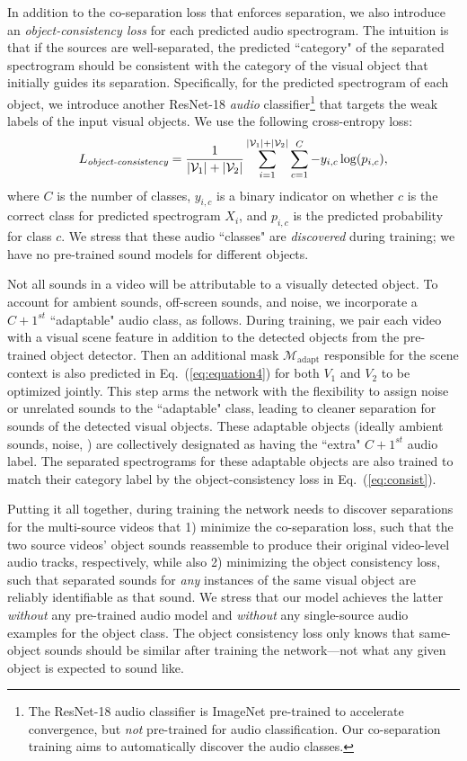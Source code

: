 \documentclass[10pt,twocolumn,letterpaper]{article}
\begin{document}
In addition to the co-separation loss that enforces separation, we also introduce an \emph{object-consistency loss} for each predicted audio spectrogram.  The intuition is that if the sources are well-separated, the predicted ``category" of the separated spectrogram should be consistent with the category of the visual object that initially guides its separation. Specifically, for the predicted spectrogram of each object, we introduce another ResNet-18 \emph{audio} classifier\footnote{The ResNet-18 audio classifier is ImageNet pre-trained to accelerate convergence, but \emph{not} pre-trained for audio classification. Our co-separation training aims to automatically discover the audio classes.} that targets the weak labels of the input visual objects. We use the following cross-entropy loss:
\begin{equation}
	\vspace{-0.05in}
	L_{\emph{object-consistency}} = \frac{1}{|\mathcal{V}_1| + |\mathcal{V}_2|} \sum_{i=1}^{|\mathcal{V}_1| + |\mathcal{V}_2|} \sum_{c=1}^{C} -y_{i,c}\log(p_{i,c}),\label{eq:consist}
\end{equation}
where $C$ is the number of classes, $y_{i,c}$ is a binary indicator on whether $c$ is the correct class for predicted spectrogram $X_i$, and $p_{i,c}$ is the predicted probability for class $c$. We stress that these audio ``classes" are \emph{discovered} during training; we have no pre-trained sound models for different objects.

Not all sounds in a video will be attributable to a visually detected object.  To account for ambient sounds, off-screen sounds, and noise, we incorporate a $C+1^{st}$ ``adaptable" audio class, as follows. During training, we pair each video with a visual scene feature in addition to the detected objects from the pre-trained object detector. Then an additional mask $\mathcal{M}_{\text{adapt}}$ responsible for the scene context is also predicted in Eq.~(\ref{eq:equation4}) for both $V_1$ and $V_2$ to be optimized jointly. This step arms the network with the flexibility to assign noise or unrelated sounds to the ``adaptable" class, leading to cleaner separation for sounds of the detected visual objects. These adaptable objects (ideally ambient sounds, noise, \etc) are collectively designated as having the ``extra" $C+1^{st}$ audio label. The separated spectrograms for these adaptable objects are also trained to match their category label by the object-consistency loss in Eq.~(\ref{eq:consist}). 

Putting it all together, during training the network needs to discover separations for the multi-source videos that 1) minimize the co-separation loss, such that the two source videos' object sounds reassemble to produce their original video-level audio tracks, respectively, while also 2) minimizing the object consistency loss, such that separated sounds for \emph{any} instances of the same visual object are reliably identifiable as that sound.  We stress that our model achieves the latter \emph{without} any pre-trained audio model and \emph{without} any single-source audio examples for the object class.  The object consistency loss only knows that same-object sounds should be similar after training the network---not what any given object is expected to sound like.
\end{document}
